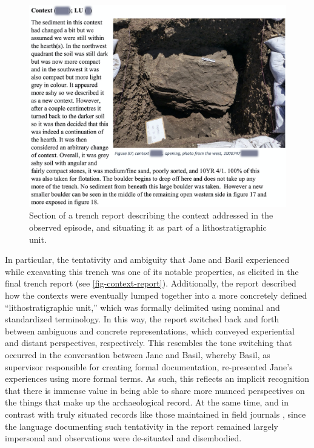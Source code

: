 \documentclass{article}
\begin{document}
\begin{figure}
\centering
\includegraphics[width=6in]{../figures/context-report.png}
\caption{Section of a trench report describing the context addressed in
the observed episode, and situating it as part of a lithostratigraphic
unit.}\label{fig-context-report}
\end{figure}

In particular, the tentativity and ambiguity that Jane and Basil
experienced while excavating this trench was one of its notable
properties, as elicited in the final trench report (see
\autoref{fig-context-report}). Additionally, the report described how
the contexts were eventually lumped together into a more concretely
defined ``lithostratigraphic unit,'' which was formally delimited using
nominal and standardized terminology. In this way, the report switched
back and forth between ambiguous and concrete representations, which
conveyed experiential and distant perspectives, respectively. This
resembles the tone switching that occurred in the conversation between
Jane and Basil, whereby Basil, as supervisor responsible for creating
formal documentation, re-presented Jane's experiences using more formal
terms. As such, this reflects an implicit recognition that there is
immense value in being able to share more nuanced perspectives on the
things that make up the archaeological record. At the same time, and in
contrast with truly situated records like those maintained in field
journals \parencite[cf.][]{batist2024a}, since the language documenting
such tentativity in the report remained largely impersonal and
observations were de-situated and disembodied.
\end{document}
